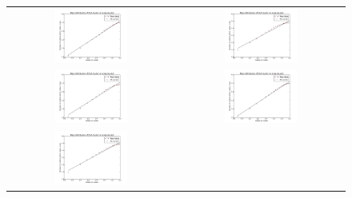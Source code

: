 \documentclass[a4paper,12pt]{article}
\begin{document}
\begin{figure}[H]
\vspace*{-0.4cm}
\centering
	\begin{tabular}{@{}cc@{}}
		\includegraphics[width = 0.45\textwidth]{pics/Fractal_dimension_final_1.pdf} &
		\includegraphics[width = 0.45\textwidth]{pics/Fractal_dimension_final_2.pdf} \\
		\includegraphics[width = 0.45\textwidth]{pics/Fractal_dimension_final_3.pdf} &
		\includegraphics[width = 0.45\textwidth]{pics/Fractal_dimension_final_4.pdf} \\
                \includegraphics[width = 0.45\textwidth]{pics/Fractal_dimension_final_5.pdf} &

\end{tabular}
\end{figure}
\end{document}
